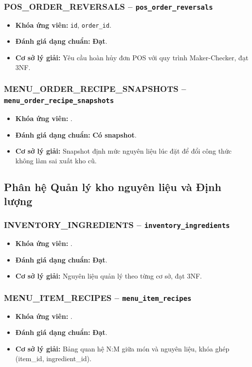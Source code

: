 \subsubsection{POS_ORDER_REVERSALS -- \texttt{pos\_order\_reversals}}
\begin{itemize}
  \item \textbf{Khóa ứng viên:} \texttt{id}, \texttt{order\_id}.
  \item \textbf{Đánh giá dạng chuẩn:} \textbf{Đạt}.
  \item \textbf{Cơ sở lý giải:} Yêu cầu hoàn hủy đơn POS với quy trình Maker-Checker, đạt 3NF.
\end{itemize}

\subsubsection{MENU_ORDER_RECIPE_SNAPSHOTS -- \texttt{menu\_order\_recipe\_snapshots}}
\begin{itemize}
  \item \textbf{Khóa ứng viên:} \texttt{}.
  \item \textbf{Đánh giá dạng chuẩn:} \textbf{Có snapshot}.
  \item \textbf{Cơ sở lý giải:} Snapshot định mức nguyên liệu lúc đặt để đổi công thức không làm sai xuất kho cũ.
\end{itemize}

\subsection{Phân hệ Quản lý kho nguyên liệu và Định lượng}
\subsubsection{INVENTORY_INGREDIENTS -- \texttt{inventory\_ingredients}}
\begin{itemize}
  \item \textbf{Khóa ứng viên:} \texttt{}.
  \item \textbf{Đánh giá dạng chuẩn:} \textbf{Đạt}.
  \item \textbf{Cơ sở lý giải:} Nguyên liệu quản lý theo từng cơ sở, đạt 3NF.
\end{itemize}

\subsubsection{MENU_ITEM_RECIPES -- \texttt{menu\_item\_recipes}}
\begin{itemize}
  \item \textbf{Khóa ứng viên:} \texttt{}.
  \item \textbf{Đánh giá dạng chuẩn:} \textbf{Đạt}.
  \item \textbf{Cơ sở lý giải:} Bảng quan hệ N:M giữa món và nguyên liệu, khóa ghép (item_id, ingredient_id).
\end{itemize}

